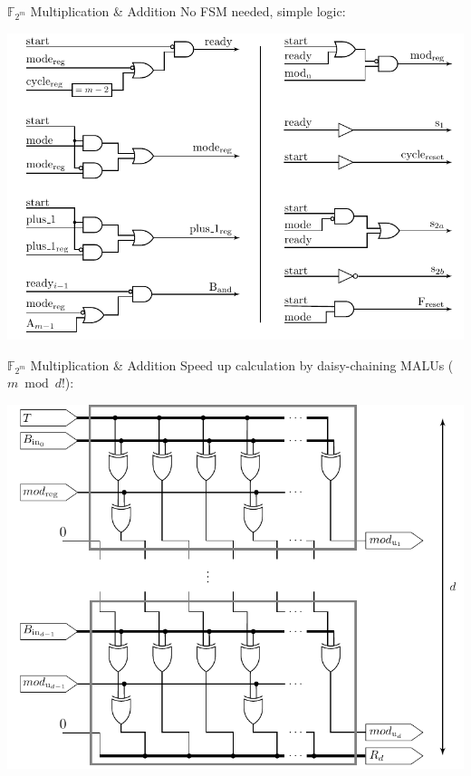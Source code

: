 \documentclass[svgnames]{beamer}
\newenvironment{changemargin}[2]{%
\begin{list}{}{%
\setlength{\topsep}{0pt}%
\setlength{\leftmargin}{#1}%
\setlength{\rightmargin}{#2}%
\setlength{\listparindent}{\parindent}%
\setlength{\itemindent}{\parindent}%
\setlength{\parsep}{\parskip}%
}%
\item[]}{\end{list}}
\begin{document}
\begin{frame}{$\mathbb{F}_{2^m}$ Multiplication \& Addition}
	No FSM needed, simple logic:\\[0.7em]
	\begin{changemargin}{-4cm}{-4cm}
		\begin{center}\includegraphics[height=0.55\paperheight]{images/wrapper-gf2m-logica}\end{center}
	\end{changemargin}
\end{frame}

\begin{frame}{$\mathbb{F}_{2^m}$ Multiplication \& Addition}
	Speed up calculation by daisy-chaining MALUs ($m \bmod d$!):\\[0.7em]
	\begin{changemargin}{-1cm}{-1cm}
	\begin{center}\includegraphics[height=0.6\paperheight]{images/malu-width-d}\end{center}
	\end{changemargin}
\end{frame}
\end{document}
